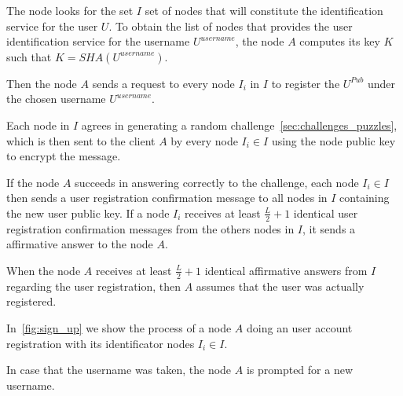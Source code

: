 The node  looks for the set $I$ set of nodes that will constitute the
identification service for the user $U$. To obtain the list of nodes that provides the user identification service for
the username $U^{username}$, the node $A$ computes its key $K$ such that $K =
SHA(U^{username})$. 

Then the node $A$ sends a request to every node $I_i$ in $I$ to register the
$U^{Pub}$ under the chosen  username  $U^{username}$.


Each node in $I$ agrees in generating a random challenge~\ref{sec:challenges_puzzles}, which is then sent to the
client $A$ by every node $I_i \in I$ using the node public key to encrypt the
message.

If the node $A$ succeeds in answering correctly to the challenge, each node $I_i \in I$ then sends a user registration confirmation message to all nodes
in $I$ containing the new user public key. If a node $I_i$ receives at
least $\frac{L}{2} + 1$ identical user registration confirmation messages from
the others nodes in $I$, it sends a affirmative answer to the node $A$.

When the node
$A$ receives at least $\frac{L}{2} + 1$ identical affirmative answers from
$I$ regarding the user registration, then $A$ assumes that the user was
actually registered.

In~\ref{fig:sign_up} we show the process of a node $A$ doing an user account
registration with its identificator nodes $I_i \in I$.

In case that the username was taken,
the node $A$ is prompted for a new username.



